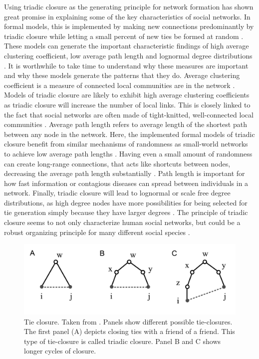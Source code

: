 \documentclass{article}
\begin{document}
Using triadic closure as the generating principle for network formation has shown great promise in explaining some of the key characteristics of social networks. In formal models, this is implemented by making new connections predominantly by triadic closure while letting a small percent of new ties be formed at random \cite{ilany_social_2016,jackson_search_2004,jackson_meeting_2007}. These models can generate the important characteristic findings of high average clustering coefficient, low average path length and lognormal degree distributions \cite{jackson_search_2004,jackson_meeting_2007}. 
It is worthwhile to take time to understand why these measures are important and why these models generate the patterns that they do. Average clustering coefficient is a measure of connected local communities are in the network \cite{watts_collective_1998}. Models of triadic closure are likely to exhibit high average clustering coefficients as triadic closure will increase the number of local links. This is closely linked to the fact that social networks are often made of tight-knitted, well-connected local communities \cite{peixoto_disentangling_2022}. Average path length refers to average length of the shortest path between any node in the network. Here, the implemented formal models of triadic closure benefit from similar mechanisms of randomness as small-world networks to achieve low average path lengths \cite{jackson_meeting_2007,watts_collective_1998}. Having even a small amount of randomness can create long-range connections, that acts like shortcuts between nodes, decreasing the average path length substantially \cite{watts_networks_1999}. Path length is important for how fast information or contagious diseases can spread between individuals in a network. Finally, triadic closure will lead to lognormal or scale free degree distributions, as high degree nodes have more possibilities for being selected for tie generation simply because they have larger degrees \cite{jackson_meeting_2007}. The principle of triadic closure seems to not only characterize human social networks, but could be a robust organizing principle for many different social species \cite{ilany_social_2016}. 

\begin{figure}[H]
    \centering
    \includegraphics[width=.8\linewidth]{../plots/references/kossinets_watts.jpeg}
  \caption{Tie closure. Taken from \protect\citeauthor{kossinets_origins_2009} \protect\citeyear{kossinets_origins_2009}. Panels show different possible tie-closures. The first panel (A) depicts closing ties with a friend of a friend. This type of tie-closure is called triadic closure. Panel B and C shows longer cycles of closure.}
  \label{fig:tie_closure}
\end{figure}
\end{document}
